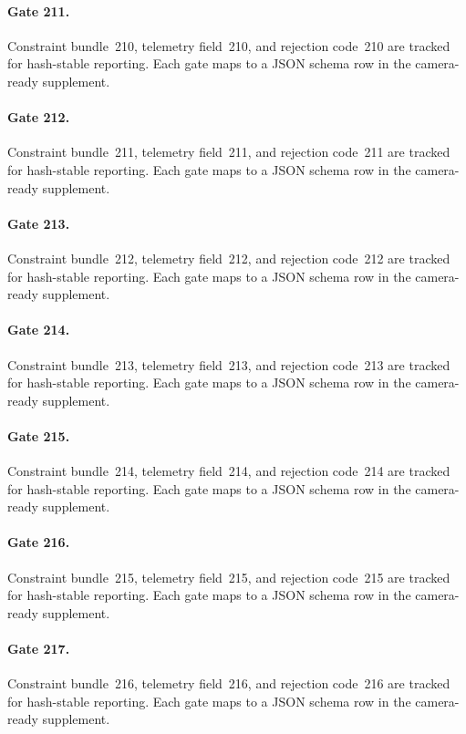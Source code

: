 \documentclass[sigconf,nonacm]{acmart}
\begin{document}
\paragraph{Gate 211.}
Constraint bundle~210, telemetry field~210, and rejection code~210 are tracked for hash-stable reporting. Each gate maps to a JSON schema row in the camera-ready supplement. %

\paragraph{Gate 212.}
Constraint bundle~211, telemetry field~211, and rejection code~211 are tracked for hash-stable reporting. Each gate maps to a JSON schema row in the camera-ready supplement. %

\paragraph{Gate 213.}
Constraint bundle~212, telemetry field~212, and rejection code~212 are tracked for hash-stable reporting. Each gate maps to a JSON schema row in the camera-ready supplement. %

\paragraph{Gate 214.}
Constraint bundle~213, telemetry field~213, and rejection code~213 are tracked for hash-stable reporting. Each gate maps to a JSON schema row in the camera-ready supplement. %

\paragraph{Gate 215.}
Constraint bundle~214, telemetry field~214, and rejection code~214 are tracked for hash-stable reporting. Each gate maps to a JSON schema row in the camera-ready supplement. %

\paragraph{Gate 216.}
Constraint bundle~215, telemetry field~215, and rejection code~215 are tracked for hash-stable reporting. Each gate maps to a JSON schema row in the camera-ready supplement. %

\paragraph{Gate 217.}
Constraint bundle~216, telemetry field~216, and rejection code~216 are tracked for hash-stable reporting. Each gate maps to a JSON schema row in the camera-ready supplement. %
\end{document}
